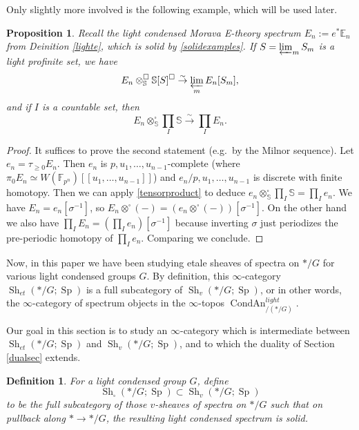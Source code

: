 \documentclass[12pt]{article}
\newtheorem{proposition}[theorem]{Proposition}
\newtheorem{definition}[theorem]{Definition}
\newcommand{\on}{\operatorname}
\begin{document}
Only slightly more involved is the following example, which will be used later.

\begin{proposition}\label{tensorwithe}
Recall the light condensed Morava E-theory spectrum $E_n:=e^\ast \mathbb{E}_n$ from Deinition \ref{lighte}, which is solid by \ref{solidexamples}.  If $S=\varprojlim_m S_m$ is a light profinite set, we have
$$E_n\otimes^\square_\mathbb{S} \mathbb{S}[S]^\square\overset{\sim}{\rightarrow}\varprojlim_m E_n[S_m],$$
and if $I$ is a countable set, then
$$E_n\otimes^\square_\mathbb{S}\prod_I\mathbb{S}\overset{\sim}{\rightarrow} \prod_I E_n.$$
\end{proposition}
\begin{proof}
It suffices to prove the second statement (e.g.\ by the Milnor sequence).  Let $e_n = \tau_{\geq 0}E_n$.  Then $e_n$ is $p,u_1,\ldots,u_{n-1}$-complete (where $\pi_0E_n \simeq W(\mathbb{F}_{p^n})[[u_1,\ldots,u_{n-1}]]$) and $e_n/p,u_1,\ldots,u_{n-1}$ is discrete with finite homotopy.  Then we can apply \ref{tensorproduct} to deduce $e_n\otimes^\square_\mathbb{S}\prod_I\mathbb{S}=\prod_Ie_n$.  We have $E_n=e_n[\sigma^{-1}]$, so $E_n\otimes^\square(-) = (e_n\otimes^\square(-))[\sigma^{-1}]$.  On the other hand we also have $\prod_I E_n = (\prod_I e_n)[\sigma^{-1}]$ because inverting $\sigma$ just periodizes the pre-periodic homotopy of $\prod_I e_n$.  Comparing we conclude.\end{proof}

Now, in this paper we have been studying etale sheaves of spectra on $\ast/G$ for various light condensed groups $G$.  By definition, this $\infty$-category $\on{Sh}_{et}(\ast/G;\on{Sp})$ is a full subcategory of $\on{Sh}_v(\ast/G;\on{Sp})$, or in other words, the $\infty$-category of spectrum objects in the $\infty$-topos $\on{CondAn}^{light}_{/(\ast/G)}$.

Our goal in this section is to study an $\infty$-category which is intermediate between $\on{Sh}_{et}(\ast/G;\on{Sp})$ and $\on{Sh}_{v}(\ast/G;\on{Sp})$, and to which the duality of Section \ref{dualsec} extends.

\begin{definition}\label{solidbg}
For a light condensed group $G$, define
$$\on{Sh}_\square(\ast/G;\on{Sp})\subset \on{Sh}_{v}(\ast/G;\on{Sp})$$
to be the full subcategory of those $v$-sheaves of spectra on $\ast/G$ such that on pullback along $\ast\to \ast/G$, the resulting light condensed spectrum is solid.
\end{definition}
\end{document}
